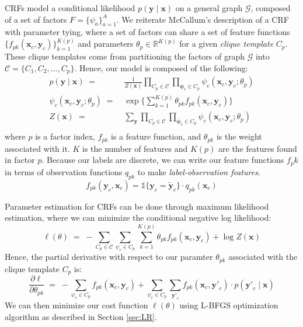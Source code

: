 \documentclass{article}
\begin{document}
CRFs model a conditional likelihood $p(\mathbf{y} \mid \mathbf{x})$ on a general
graph $\mathcal{G}$, composed of a set of factors
$F = \{ \psi_a \} _{a=1}^{A}$. We reiterate McCallum's description
of a CRF with parameter tying, where a set of factors can share a set of feature
functions $\{f_{pk}\left(\mathbf{x}_c, \mathbf{y}_c \right)\}_{k=1}^{K(p)}$ and
parameters $\theta_p \in \mathbb{R}^{K(p)}$ for a given \textit{clique template}
$C_p$. These clique templates come from partitioning the factors of graph
$\mathcal{G}$ into $\mathcal{C} = \{C_1, C_2, \hdots, C_p \}$. Hence, our model
is composed of the following:
\begin{equation}
  \begin{aligned}
    p(\mathbf{y} \mid \mathbf{x}) \; = \; & \frac{1}{Z(\mathbf{x})} \prod_{C_p \in \mathcal{C}} \prod_{\mathbf{\psi}_c \in C_p} \psi_c (\mathbf{x}_c, \mathbf{y}_c ; \theta_p) \\
    \psi_c (\mathbf{x}_c, \mathbf{y}_c ; \theta_p ) \; = \; & \exp \Bigg\{ \sum_{k=1}^{K(p)} \theta_{pk} f_{pk} (\mathbf{x}_c, \mathbf{y}_c) \Bigg\} \\
    Z(\mathbf{x}) \; = \; & \sum_{\mathbf{y}} \prod_{C_p \in \mathcal{C}} \prod_{\mathbf{\psi}_c \in C_p} \psi_c (\mathbf{x}_c, \mathbf{y}_c ; \theta_p) \\
  \end{aligned}
\end{equation}
where $p$ is a factor index, $f_{pk}$ is a feature function, and $\theta_{pk}$ is the
weight associated with it. $K$ is the number of features and $K(p)$ are the
features found in factor $p$.
Because our labels are discrete, we can write our
feature functions $f_pk$ in terms of observation functions $q_{pk}$ to make
\textit{label-observation features}.
\begin{equation}
  f_{pk} (\mathbf{y}_c, \mathbf{x}_c) = \mathds{1} \{\mathbf{y}_c = \mathbf{\widetilde{y}}_c\} \cdot q_{pk}(\mathbf{x}_c)
\end{equation}

Parameter estimation for CRFs can be done through maximum likelihood estimation,
where we can minimize the conditional negative log likelihood:
\begin{equation}
  \ell (\theta) \; = \; - \sum_{C_p \in \mathcal{C}} \sum_{\psi_c \in C_p} \sum_{k=1}^{K(p)} \theta_{pk} f_{pk} (\mathbf{x}_c, \mathbf{y}_c) + \log Z(\mathbf{x})
\end{equation}
Hence, the partial derivative with respect to our paramter $\theta_{pk}$ associated
with the clique template $C_p$ is:
\begin{equation}
  \frac{\partial \ell}{\partial \theta_{pk}} \; = \; - \sum_{\psi_c \in C_p} f_{pk} (\mathbf{x}_c, \mathbf{y}_c) + \sum_{\psi_c \in C_p} \sum_{\mathbf{y'}_c} f_{pk} (\mathbf{x}_c, \mathbf{y'}_c) \cdot p(\mathbf{y'}_c \mid \mathbf{x})
\end{equation}
We can then minimize our cost function $\ell(\theta)$ using L-BFGS optimization
algorithm as described in Section \ref{sec:LR}.
\end{document}

